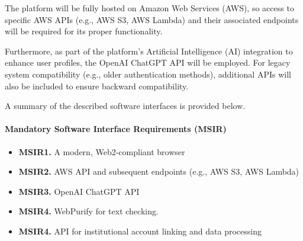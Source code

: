 The platform will be fully hosted on Amazon Web Services (AWS), so access to specific AWS APIs (e.g., AWS S3, AWS Lambda) and their associated endpoints will be required for its proper functionality.

Furthermore, as part of the platform's Artificial Intelligence (AI) integration to enhance user profiles, the OpenAI ChatGPT API will be employed. 
For legacy system compatibility (e.g., older authentication methods), additional APIs will also be included to ensure backward compatibility.


A summary of the described software interfaces is provided below.

\paragraph{Mandatory Software Interface Requirements (MSIR)}
\begin{itemize}
    \item \textbf{MSIR1.} A modern, Web2-compliant browser
    \item \textbf{MSIR2.} AWS API and subsequent endpoints (e.g., AWS S3, AWS Lambda)
    \item \textbf{MSIR3.} OpenAI ChatGPT API
    \item \textbf{MSIR4.} WebPurify for text checking.
    \item \textbf{MSIR4.} API for institutional account linking and data processing

\end{itemize}




